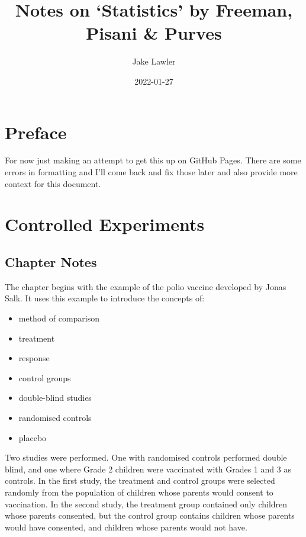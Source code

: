 \documentclass[
]{book}
\title{Notes on `Statistics' by Freeman, Pisani \& Purves}
\author{Jake Lawler}
\date{2022-01-27}
\providecommand{\tightlist}{%
  \setlength{\itemsep}{0pt}\setlength{\parskip}{0pt}}
\begin{document}
\maketitle

{
\setcounter{tocdepth}{1}
\tableofcontents
}
\hypertarget{preface}{%
\chapter*{Preface}\label{preface}}

For now just making an attempt to get this up on GitHub Pages. There are some errors in formatting and I'll come back and fix those later and also provide more context for this document.

\hypertarget{experiments}{%
\chapter{Controlled Experiments}\label{experiments}}

\hypertarget{chapter-notes}{%
\section{Chapter Notes}\label{chapter-notes}}

The chapter begins with the example of the polio vaccine developed by Jonas Salk. It uses this example to introduce the concepts of:

\begin{itemize}
\tightlist
\item
  method of comparison
\item
  treatment
\item
  response
\item
  control groups
\item
  double-blind studies
\item
  randomised controls
\item
  placebo
\end{itemize}

Two studies were performed. One with randomised controls performed double blind, and one where Grade 2 children were vaccinated with Grades 1 and 3 as controls. In the first study, the treatment and control groups were selected randomly from the population of children whose parents would consent to vaccination. In the second study, the treatment group contained only children whose parents consented, but the control group contains children whose parents would have consented, and children whose parents would not have.
\end{document}
